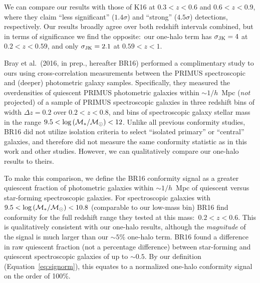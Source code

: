 We can compare our results with those of K16 at ${0.3<z<0.6}$ and ${0.6<z<0.9}$, where they claim 
``less significant'' ($1.4\sigma$) and ``strong'' ($4.5\sigma$) detections, respectively.
Our results broadly agree over both redshift intervals combined, but in terms of significance we find the opposite:~our one-halo term has ${\sigmaJK=4}$ at ${0.2<z<0.59}$, and only ${\sigmaJK=2.1}$ at ${0.59<z<1}$.

Bray et al.~(2016, in prep., hereafter BR16) performed a complimentary study to ours using 
cross-correlation measurements between the PRIMUS spectroscopic and (deeper) photometric galaxy samples.
Specifically, they measured the overdensities of quiescent PRIMUS photometric galaxies within $\sim1/h$~Mpc 
(\emph{not} projected) of a sample of PRIMUS spectroscopic galaxies in three redshift bins of width ${\Delta z=0.2}$ over ${0.2<z<0.8}$, 
and bins of spectroscopic galaxy stellar mass in the range ${9.5<\logM<12}$.
Unlike all previous conformity studies, BR16 did not utilize isolation criteria to select ``isolated primary'' or ``central'' galaxies, and therefore did not measure the same conformity statistic as in this work and other studies.
However, we can qualitatively compare our one-halo results to theirs.

To make this comparison, we define the BR16 conformity signal as a greater quiescent fraction of photometric galaxies within $\sim1/h$~Mpc of quiescent versus star-forming spectroscopic galaxies.
For spectroscopic galaxies with ${9.5 < \logM < 10.8}$ (comparable to our low-mass bin) BR16 find conformity for the full redshift range they tested at this mass:~${0.2<z<0.6}$.
This is qualitatively consistent with our one-halo results, although the \emph{magnitude} of the signal is much larger than our $\sim5$\% one-halo term.
BR16 found a difference in raw quiescent fraction (not a percentage difference) between star-forming and quiescent spectroscopic galaxies of up to $\sim0.5$.
By our definition (Equation~\ref{eq:signorm}), this equates to a normalized one-halo conformity signal on the order of 100\%.


